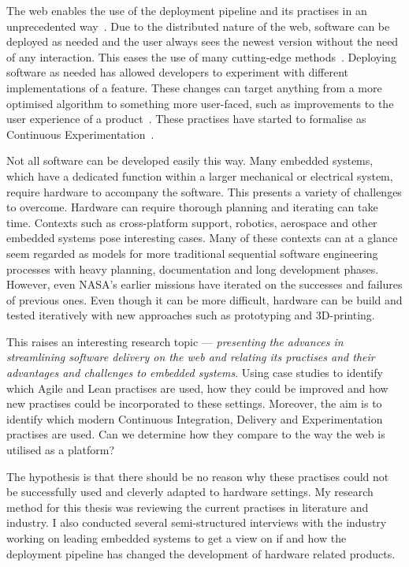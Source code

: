 \documentclass[english]{tktltiki2}
\begin{document}
The web enables the use of the deployment pipeline and its practises in an unprecedented way~\cite{KLS09}. Due to the distributed nature of the web, software can be deployed as needed and the user always sees the newest version without the need of any interaction. This eases the use of many cutting-edge methods~\cite{KLS09}. Deploying software as needed has allowed developers to experiment with different implementations of a feature. These changes can target anything from a more optimised algorithm to something more user-faced, such as improvements to the user experience of a product~\cite{KLS09}. These practises have started to formalise as Continuous Experimentation~\cite{FGM14}.

Not all software can be developed easily this way. Many embedded systems, which have a dedicated function within a larger mechanical or electrical system, require hardware to accompany the software. This presents a variety of challenges to overcome. Hardware can require thorough planning and iterating can take time. Contexts such as cross-platform support, robotics, aerospace and other embedded systems pose interesting cases. Many of these contexts can at a glance seem regarded as models for more traditional sequential software engineering processes with heavy planning, documentation and long development phases. However, even NASA’s earlier missions have iterated on the successes and failures of previous ones. Even though it can be more difficult, hardware can be build and tested iteratively with new approaches such as prototyping and 3D-printing.

This raises an interesting research topic — \emph{presenting the advances in streamlining software delivery on the web and relating its practises and their advantages and challenges to embedded systems}. Using case studies to identify which Agile and Lean practises are used, how they could be improved and how new practises could be incorporated to these settings. Moreover, the aim is to identify which modern Continuous Integration, Delivery and Experimentation practises are used. Can we determine how they compare to the way the web is utilised as a platform?

The hypothesis is that there should be no reason why these practises could not be successfully used and cleverly adapted to hardware settings. My research method for this thesis was reviewing the current practises in literature and industry. I also conducted several semi-structured interviews with the industry working on leading embedded systems to get a view on if and how the deployment pipeline has changed the development of hardware related products.
\end{document}
